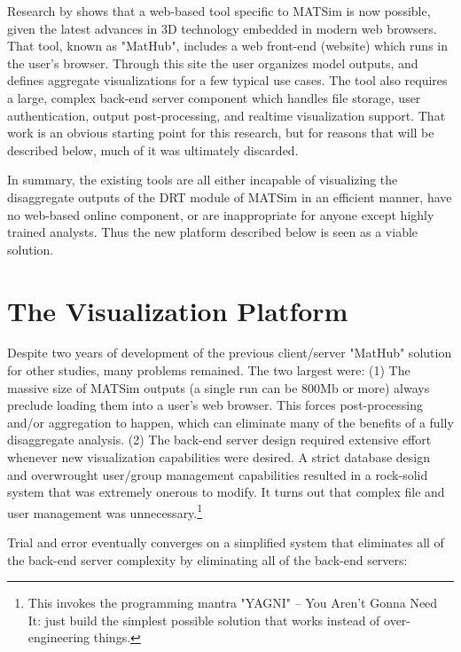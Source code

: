 \documentclass[3p,times,procedia]{elsarticle}
\begin{document}
Research by \citet{CharltonLaudan2020WebBasedVisualization} shows that a web-based tool specific to MATSim is now possible, given the latest advances in 3D technology embedded in modern web browsers. That tool, known as "MatHub", includes a web front-end (website) which runs in the user's browser. Through this site the user organizes model outputs, and defines aggregate visualizations for a few typical use cases. The tool also requires a large, complex back-end server component which handles file storage, user authentication, output post-processing, and realtime visualization support. That work is an obvious starting point for this research, but for reasons that will be described below, much of it was ultimately discarded.

In summary, the existing tools are all either incapable of visualizing the disaggregate outputs of the DRT module of MATSim in an efficient manner, have no web-based online component, or are inappropriate for anyone except highly trained analysts. Thus the new platform described below is seen as a viable solution.

\section{The Visualization Platform}
\label{platform}

Despite two years of development of the previous client/server "MatHub" solution for other studies, many problems remained. The two largest were: (1) The massive size of MATSim outputs (a single run can be 800Mb or more) always preclude loading them into a user's web browser. This forces post-processing and/or aggregation to happen, which can eliminate many of the benefits of a fully disaggregate analysis. (2) The back-end server design required extensive effort whenever new visualization capabilities were desired. A strict database design and overwrought user/group management capabilities resulted in a rock-solid system that was extremely onerous to modify. It turns out that complex file and user management was unnecessary.\footnote{This invokes the programming mantra "YAGNI" -- You Aren't Gonna Need It: just build the simplest possible solution that works instead of over-engineering things.}

Trial and error eventually converges on a simplified system that eliminates all of the back-end server complexity by eliminating all of the back-end servers:
\end{document}
